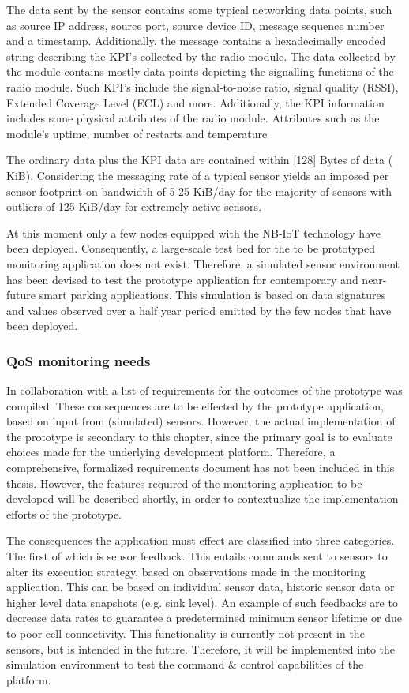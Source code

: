 The data sent by the sensor contains some typical networking data points, such as source IP address, source port, source device ID, message sequence number and a timestamp. Additionally, the message contains a hexadecimally encoded string describing the KPI's collected by the \ublox radio module. The data collected by the \ublox module contains mostly data points depicting the signalling functions of the radio module. Such KPI's include the signal-to-noise ratio, signal quality (RSSI), Extended Coverage Level (ECL) and more. Additionally, the KPI information includes some physical attributes of the radio module. Attributes such as the module's uptime, number of restarts and temperature

The ordinary data plus the \ublox KPI data are contained within [128] Bytes of data ( KiB). Considering the messaging rate of a typical sensor yields an imposed per sensor footprint on bandwidth of 5-25 KiB/day for the majority of sensors with outliers of 125 KiB/day for extremely active sensors.

At this moment only a few nodes equipped with the NB-IoT technology have been deployed. Consequently, a large-scale test bed for the to be prototyped monitoring application does not exist. Therefore, a simulated sensor environment has been devised to test the prototype application for contemporary and near-future smart parking applications. This simulation is based on data signatures and values observed over a half year period emitted by the few nodes that have been deployed.

\subsubsection{QoS monitoring needs}
In collaboration with \idsystems a list of requirements for the outcomes of the prototype was compiled. These consequences are to be effected by the prototype application, based on input from (simulated) sensors. However, the actual implementation of the prototype is secondary to this chapter, since the primary goal is to evaluate choices made for the underlying development platform. Therefore, a comprehensive, formalized requirements document has not been included in this thesis. However, the features required of the monitoring application to be developed will be described shortly, in order to contextualize the implementation efforts of the prototype.

The consequences the application must effect are classified into three categories. The first of which is sensor feedback. This entails commands sent to sensors to alter its execution strategy, based on observations made in the monitoring application. This can be based on individual sensor data, historic sensor data or higher level data snapshots (e.g. sink level). An example of such feedbacks are to decrease data rates to guarantee a predetermined minimum sensor lifetime or due to poor cell connectivity. This functionality is currently not present in the \nedap sensors, but is intended in the future. Therefore, it will be implemented into the simulation environment to test the command \& control capabilities of the platform.

